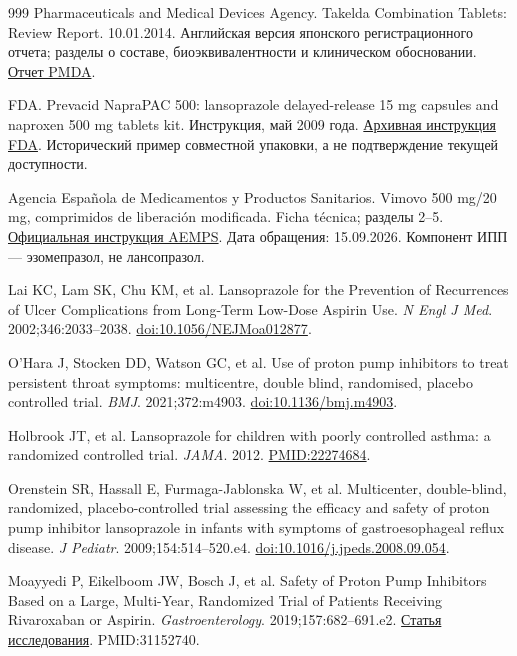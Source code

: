 \documentclass[11pt,a4paper,notitlepage]{report}
\begin{document}
\begin{thebibliography}{999}
 Pharmaceuticals and Medical Devices Agency. Takelda Combination Tablets: Review Report. 10.01.2014. Английская версия японского регистрационного отчета; разделы о составе, биоэквивалентности и клиническом обосновании. \href{https://www.pmda.go.jp/files/000208812.pdf}{Отчет PMDA}.

 FDA. Prevacid NapraPAC 500: lansoprazole delayed-release 15 mg capsules and naproxen 500 mg tablets kit. Инструкция, май 2009 года. \href{https://www.accessdata.fda.gov/drugsatfda_docs/label/2009/021507s009lbl.pdf}{Архивная инструкция FDA}. Исторический пример совместной упаковки, а не подтверждение текущей доступности.

 Agencia Española de Medicamentos y Productos Sanitarios. Vimovo 500 mg/20 mg, comprimidos de liberación modificada. Ficha técnica; разделы 2--5. \href{https://cima.aemps.es/cima/dochtml/ft/73182/FT_73182.html}{Официальная инструкция AEMPS}. Дата обращения: 15.09.2026. Компонент ИПП --- эзомепразол, не лансопразол.

 Lai KC, Lam SK, Chu KM, et al. Lansoprazole for the Prevention of Recurrences of Ulcer Complications from Long-Term Low-Dose Aspirin Use. \textit{N Engl J Med}. 2002;346:2033--2038. \href{https://doi.org/10.1056/NEJMoa012877}{doi:10.1056/NEJMoa012877}.

 O'Hara J, Stocken DD, Watson GC, et al. Use of proton pump inhibitors to treat persistent throat symptoms: multicentre, double blind, randomised, placebo controlled trial. \textit{BMJ}. 2021;372:m4903. \href{https://doi.org/10.1136/bmj.m4903}{doi:10.1136/bmj.m4903}.

 Holbrook JT, et al. Lansoprazole for children with poorly controlled asthma: a randomized controlled trial. \textit{JAMA}. 2012. \href{https://pubmed.ncbi.nlm.nih.gov/22274684/}{PMID:22274684}.

 Orenstein SR, Hassall E, Furmaga-Jablonska W, et al. Multicenter, double-blind, randomized, placebo-controlled trial assessing the efficacy and safety of proton pump inhibitor lansoprazole in infants with symptoms of gastroesophageal reflux disease. \textit{J Pediatr}. 2009;154:514--520.e4. \href{https://doi.org/10.1016/j.jpeds.2008.09.054}{doi:10.1016/j.jpeds.2008.09.054}.

 Moayyedi P, Eikelboom JW, Bosch J, et al. Safety of Proton Pump Inhibitors Based on a Large, Multi-Year, Randomized Trial of Patients Receiving Rivaroxaban or Aspirin. \textit{Gastroenterology}. 2019;157:682--691.e2. \href{https://www.sciencedirect.com/science/article/pii/S0016508519409748}{Статья исследования}. PMID:31152740.


\end{thebibliography}
\end{document}
